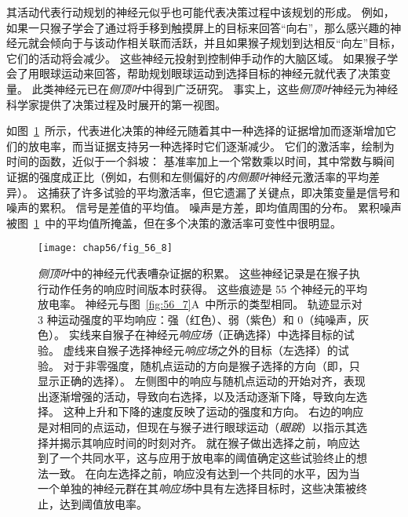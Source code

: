其活动代表行动规划的神经元似乎也可能代表决策过程中该规划的形成。
例如，如果一只猴子学会了通过将手移到触摸屏上的目标来回答“向右”，那么感兴趣的神经元就会倾向于与该动作相关联而活跃，并且如果猴子规划到达相反“向左”目标，它们的活动将会减少。
这些神经元投射到控制伸手动作的大脑区域。
如果猴子学会了用眼球运动来回答，帮助规划眼球运动到选择目标的神经元就代表了决策变量。
此类神经元已在\textit{侧顶叶}中得到广泛研究。
事实上，这些\textit{侧顶叶}神经元为神经科学家提供了决策过程及时展开的第一视图。


如图~\ref{fig:56_8}~所示，代表进化决策的神经元随着其中一种选择的证据增加而逐渐增加它们的放电率，而当证据支持另一种选择时它们逐渐减少。
它们的激活率，绘制为时间的函数，近似于一个斜坡：
基准率加上一个常数乘以时间，其中常数与瞬间证据的强度成正比（例如，右侧和左侧偏好的\textit{内侧颞叶}神经元激活率的平均差异）。
这捕获了许多试验的平均激活率，但它遗漏了关键点，即决策变量是信号和噪声的累积。
信号是差值的平均值。
噪声是方差，即均值周围的分布。
累积噪声被图~\ref{fig:56_8}~中的平均值所掩盖，但在多个决策的激活率可变性中很明显。


\begin{figure}[htbp]
	\centering
	\texttt{[image: chap56/fig\_56\_8]}
	\caption{\textit{侧顶叶}中的神经元代表嘈杂证据的积累。
		这些神经记录是在猴子执行动作任务的响应时间版本时获得。
		这些痕迹是 55 个神经元的平均放电率。
		神经元与图~\ref{fig:56_7}A~中所示的类型相同。
		轨迹显示对 3 种运动强度的平均响应：强（红色）、弱（紫色）和 0（纯噪声，灰色）。
		实线来自猴子在神经元\textit{响应场}（正确选择）中选择目标的试验。
		虚线来自猴子选择神经元\textit{响应场}之外的目标（左选择）的试验。
		对于非零强度，随机点运动的方向是猴子选择的方向（即，只显示正确的选择）。
		左侧图中的响应与随机点运动的开始对齐，表现出逐渐增强的活动，导致向右选择，以及活动逐渐下降，导致向左选择。
		这种上升和下降的速度反映了运动的强度和方向。
		右边的响应是对相同的点运动，但现在与猴子进行眼球运动（\textit{眼跳}）以指示其选择并揭示其响应时间的时刻对齐。
		就在猴子做出选择之前，响应达到了一个共同水平，这与应用于放电率的阈值确定这些试验终止的想法一致。
		在向左选择之前，响应没有达到一个共同的水平，因为当一个单独的神经元群在其\textit{响应场}中具有左选择目标时，这些决策被终止，达到阈值放电率\cite{roitman2002response}。}
	\label{fig:56_8}
\end{figure}


